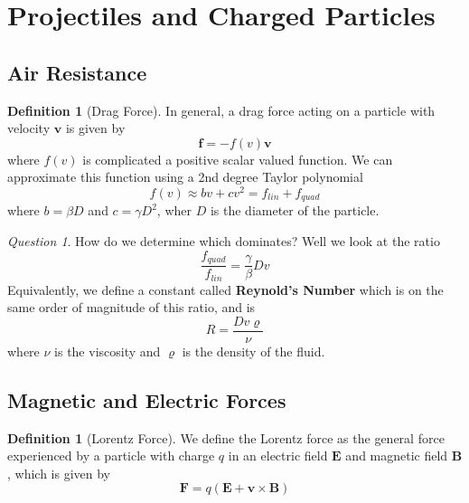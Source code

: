 \documentclass[12pt]{article}
\theoremstyle{definition}
\newtheorem{defn}[thm]{Definition}
\theoremstyle{remark}
\newtheorem*{qst}{Question}
\numberwithin{equation}{section}
\newcommand\B[1]{\textbf{#1}}
\begin{document}
\clearpage

\section{Projectiles and Charged Particles}



\subsection{Air Resistance}


\begin{defn}[Drag Force]
        In general, a drag force acting on a particle with velocity $\B{v}$ is given by \begin{equation}
                \B{f} = -f(v)\B{v}
        \end{equation}
        where $f(v)$ is complicated a positive scalar valued function. We can approximate this function using a 2nd degree Taylor polynomial \begin{equation}
                f(v) \approx bv + cv^2 =f_{lin} + f_{quad}
        \end{equation}
        where $b = \beta D$ and $c = \gamma D^2$, wher $D$ is the diameter of the particle.
\end{defn}
\vspace{15pt}

\begin{qst}
        How do we determine which dominates? Well we look at the ratio \begin{equation}
                \frac{f_{quad}}{f_{lin}} = \frac{\gamma}{\beta}Dv
        \end{equation}
        Equivalently, we define a constant called \B{Reynold's Number} which is on the same order of magnitude of this ratio, and is \begin{equation}
                R = \frac{Dv\varrho}{\nu}
        \end{equation}
        where $\nu$ is the viscosity and $\varrho$ is the density of the fluid.
\end{qst}

\vspace{15pt}


\subsection{Magnetic and Electric Forces}


\begin{defn}[Lorentz Force]
        We define the Lorentz force as the general force experienced by a particle with charge $q$ in an electric field $\B{E}$ and magnetic field $\B{B}$, which is given by \begin{equation}
                \B{F} = q(\B{E}+\B{v}\times\B{B})
        \end{equation}
\end{defn}
\end{document}
